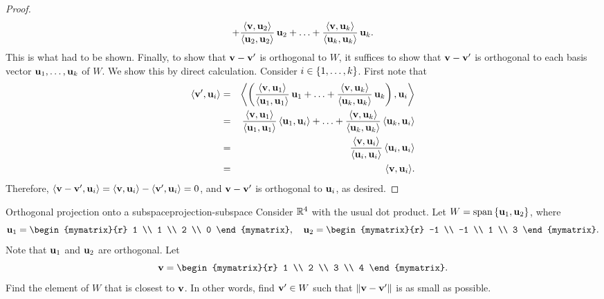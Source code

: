 \begin{proof}
\begin{equation*}
    + \frac{\iprod{\vect{v},\vect{u}_2}}{\iprod{\vect{u}_2,\vect{u}_2}}\,\vect{u}_2
    + \ldots
    + \frac{\iprod{\vect{v},\vect{u}_k}}{\iprod{\vect{u}_k,\vect{u}_k}}\,\vect{u}_k.
  \end{equation*}
  This is what had to be shown. Finally, to show that
  $\vect{v}-\vect{v}'$ is orthogonal to $W$, it suffices to show that
  $\vect{v}-\vect{v}'$ is orthogonal to each basis vector
  $\vect{u}_1,\ldots,\vect{u}_k$ of $W$. We show this by direct calculation.
  Consider $i\in\left\{1,\ldots,k\right\}$. First note that
  \begin{eqnarray*}
    \iprod{\vect{v}',\vect{u}_i}
    &=& \bigiprod{\paren{
        \frac{\iprod{\vect{v},\vect{u}_1}}{\iprod{\vect{u}_1,\vect{u}_1}}\,\vect{u}_1
        + \ldots
        + \frac{\iprod{\vect{v},\vect{u}_k}}{\iprod{\vect{u}_k,\vect{u}_k}}\,\vect{u}_k}
        ,\vect{u}_i}\\
    &=&
        \frac{\iprod{\vect{v},\vect{u}_1}}{\iprod{\vect{u}_1,\vect{u}_1}}\,\iprod{\vect{u}_1,\vect{u}_i}
        + \ldots
        + \frac{\iprod{\vect{v},\vect{u}_k}}{\iprod{\vect{u}_k,\vect{u}_k}}\,\iprod{\vect{u}_k,\vect{u}_i}
    \\
    &=& \frac{\iprod{\vect{v},\vect{u}_i}}{\iprod{\vect{u}_i,\vect{u}_i}}\,\iprod{\vect{u}_i,\vect{u}_i}\\
    &=& \iprod{\vect{v},\vect{u}_i}.
  \end{eqnarray*}
  Therefore,
  $\iprod{\vect{v}-\vect{v}',\vect{u}_i} = \iprod{\vect{v},\vect{u}_i}
  - \iprod{\vect{v}',\vect{u}_i} = 0$, and $\vect{v}-\vect{v}'$ is
  orthogonal to $\vect{u}_i$, as desired.
\end{proof}

\begin{example}{Orthogonal projection onto a subspace}{projection-subspace}
  Consider $\mathbb{R}^4$ with the usual dot product. Let
  $W=\sspan\set{\vect{u}_1,\vect{u}_2}$, where
  \begin{equation*}
    \vect{u}_1 = \begin{mymatrix}{r} 1 \\ 1 \\ 2 \\ 0 \end{mymatrix}, \quad
    \vect{u}_2 = \begin{mymatrix}{r} -1 \\ -1 \\ 1 \\ 3 \end{mymatrix}.
  \end{equation*}
  Note that $\vect{u}_1$ and $\vect{u}_2$ are orthogonal. Let
  \begin{equation*}
    \vect{v} = \begin{mymatrix}{r} 1 \\ 2 \\ 3 \\ 4 \end{mymatrix}.
  \end{equation*}
  Find the element of\/ $W$ that is closest to $\vect{v}$. In other
  words, find $\vect{v}'\in W$ such that $\norm{\vect{v}-\vect{v}'}$
  is as small as possible.
\end{example}


